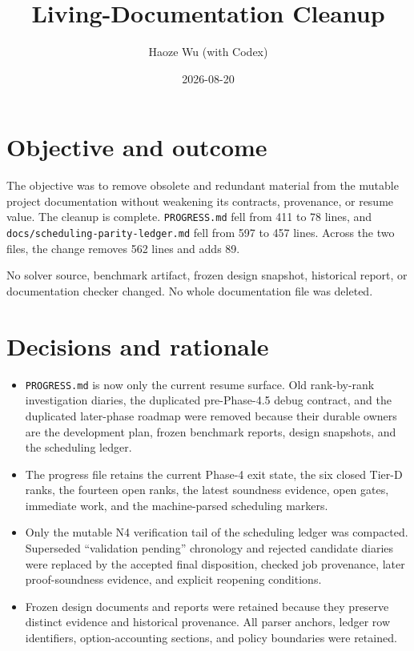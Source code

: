 \documentclass[11pt]{article}
\title{Living-Documentation Cleanup}
\author{Haoze Wu (with Codex)}
\date{2026-08-20}
\begin{document}
\maketitle

\section{Objective and outcome}

The objective was to remove obsolete and redundant material from the mutable
project documentation without weakening its contracts, provenance, or resume
value.  The cleanup is complete.  \texttt{PROGRESS.md} fell from 411 to 78
lines, and \texttt{docs/scheduling-parity-ledger.md} fell from 597 to 457
lines.  Across the two files, the change removes 562 lines and adds 89.

No solver source, benchmark artifact, frozen design snapshot, historical
report, or documentation checker changed.  No whole documentation file was
deleted.

\section{Decisions and rationale}

\begin{itemize}
\item \texttt{PROGRESS.md} is now only the current resume surface.  Old
  rank-by-rank investigation diaries, the duplicated pre-Phase-4.5 debug
  contract, and the duplicated later-phase roadmap were removed because their
  durable owners are the development plan, frozen benchmark reports, design
  snapshots, and the scheduling ledger.
\item The progress file retains the current Phase-4 exit state, the six closed
  Tier-D ranks, the fourteen open ranks, the latest soundness evidence, open
  gates, immediate work, and the machine-parsed scheduling markers.
\item Only the mutable N4 verification tail of the scheduling ledger was
  compacted.  Superseded ``validation pending'' chronology and rejected
  candidate diaries were replaced by the accepted final disposition, checked
  job provenance, later proof-soundness evidence, and explicit reopening
  conditions.
\item Frozen design documents and reports were retained because they preserve
  distinct evidence and historical provenance.  All parser anchors, ledger
  row identifiers, option-accounting sections, and policy boundaries were
  retained.
\end{itemize}
\end{document}
